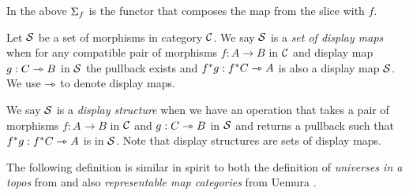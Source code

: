 In the above $\Sigma_{f}$ is the functor that composes the map from the slice with $f$.

\begin{dfn}[Display]
  Let $\mathcal{S}$ be a set of morphisms in category $\mathcal{C}$.
  We say $\mathcal{S}$ is a \textit{set of display maps} when for any compatible
  pair of morphisms $f : A \to B$ in $\mathcal{C}$ and display map $g : C \rightarrowtriangle B$ in $\mathcal{S}$
  the pullback exists and $f^{*}g : f^{*} C \rightarrowtriangle A$ is also a display map $\mathcal{S}$.
  We use $\rightarrowtriangle$ to denote display maps.

  We say $\mathcal{S}$ is a \textit{display structure} when we have an operation that
  takes a pair of morphisms $f : A \to B$ in $\mathcal{C}$ and $g : C \rightarrowtriangle B$ in $\mathcal{S}$
  and returns a pullback such that $f^{*}g : f^{*}C \rightarrowtriangle A$ is in $\mathcal{S}$.
  Note that display structures are sets of display maps.
\end{dfn}


The following definition is similar in spirit to both the definition of
\textit{universes in a topos} from \cite{streicher} and also
\textit{representable map categories} from Uemura \cite{uemura2019general}.

